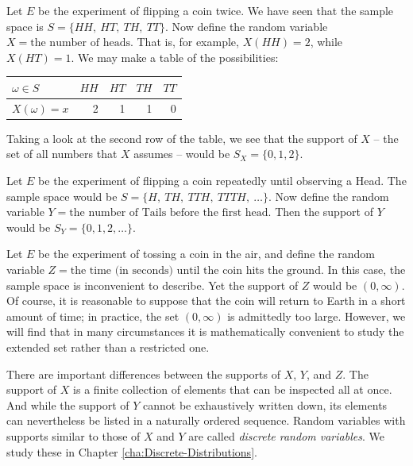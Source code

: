 \documentclass[captions=tableheading]{scrbook}
\begin{document}
\begin{example}
Let \(E\) be the experiment of flipping a coin twice. We have seen that the sample space is \( S = \{ HH,\ HT,\ TH,\ TT \} \). Now define the random variable \(X = \mbox{the number of heads}\). That is, for example, \(X(HH)=2\), while \(X(HT)=1\). We may make a table of the possibilities:


\begin{center}
\begin{tabular}{lrrrr}
 \(\omega\in S\)  &  \(HH\)  &  \(HT\)  &  \(TH\)  &  \(TT\)  \\
\hline
 \(X(\omega)=x\)  &       2  &       1  &       1  &       0  \\
\end{tabular}
\end{center}



Taking a look at the second row of the table, we see that the support of \(X\) -- the set of all numbers that \(X\) assumes -- would be \( S_{X}= \{ 0,1,2 \} \).
\end{example}

\begin{example}
Let \(E\) be the experiment of flipping a coin repeatedly until observing a Head. The sample space would be \(S= \{ H,\ TH,\ TTH,\ TTTH,\ \ldots \} \). Now define the random variable \(Y=\mbox{the number of Tails before the first head}\). Then the support of \(Y\) would be \( S_{Y}= \{ 0,1,2,\ldots \} \).
\end{example}

\begin{example}
Let \(E\) be the experiment of tossing a coin in the air, and define the random variable \( Z = \mbox{the time (in seconds) until the coin hits the ground} \). In this case, the sample space is inconvenient to describe. Yet the support of \(Z\) would be \((0,\infty)\). Of course, it is reasonable to suppose that the coin will return to Earth in a short amount of time; in practice, the set \((0,\infty)\) is admittedly too large. However, we will find that in many circumstances it is mathematically convenient to study the extended set rather than a restricted one. 
\end{example}

There are important differences between the supports of \(X\), \(Y\), and \(Z\). The support of \(X\) is a finite collection of elements that can be inspected all at once. And while the support of \(Y\) cannot be exhaustively written down, its elements can nevertheless be listed in a naturally ordered sequence. Random variables with supports similar to those of \(X\) and \(Y\) are called \emph{discrete random variables}. We study these in Chapter \ref{cha:Discrete-Distributions}.
\end{document}
